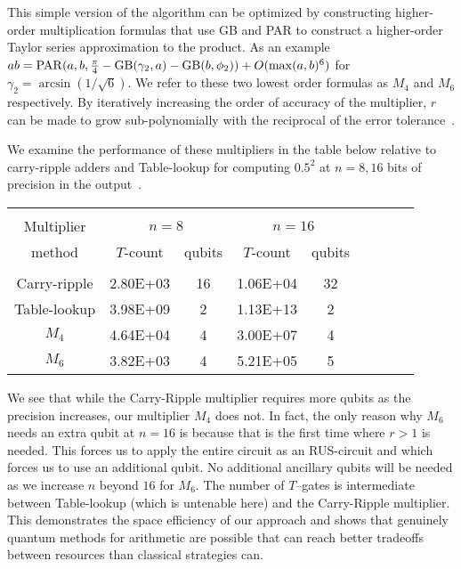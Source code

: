 \documentclass[conference]{IEEEtran}
\begin{document}
This simple version of the algorithm can be optimized by constructing higher-order multiplication formulas that use GB and PAR to construct a higher-order Taylor series approximation to the product.  As an example ${ab=\rm PAR}(a,b,\frac{\pi}{4}- {\rm GB}(\gamma_2,a)-{\rm GB}(b,\phi_2))+ O(\max(a,b)^6)$ for $\gamma_2 =\arcsin(1/\sqrt{6})$.  We refer to these two lowest order formulas as $M_4$ and $M_6$ respectively.  By iteratively increasing the order of accuracy of the multiplier, $r$ can be made to grow sub-polynomially with the reciprocal of the error tolerance~\cite{WR16}.

We examine the performance of these multipliers in the table below relative to carry-ripple adders and Table-lookup for computing $0.5^2$ at $n=8,16$ bits of precision in the output~\cite{WR16}.
\begin{table}[h!]
\centering
\footnotesize
\begin{tabular}{c@{\qquad}c@{\quad}c@{\qquad}c@{\quad}c@{\qquad}c@{\quad}c@{\qquad}c@{\quad}c}
\hline\\
Multiplier & \multicolumn{2}{c}{$n=8$\phantom{111}} & \multicolumn{2}{c}{$n=16$} \\[0.5ex]
method      & $T$-count & qubits & $T$-count & qubits \\[1.5ex]
\hline\\
Carry-ripple & 2.80E+03 & 16 & 1.06E+04  &32\\[1.5ex]
Table-lookup  & 3.98E+09 & 2 & 1.13E+13& 2\\[1.5ex]
$M_4$  &4.64E+04 &4 &3.00E+07 &4 \\[1.5ex] 
$M_6$  &3.82E+03 &4 & 5.21E+05&5 \\[1.5ex] 
\hline
\end{tabular}
\end{table}

We see that while the Carry-Ripple multiplier requires more qubits as the precision increases, our multiplier $M_4$ does not.  In fact, the only reason why $M_6$ needs an extra qubit at $n=16$ is because that is the first time where $r>1$ is needed.  This forces us to apply the entire circuit as an RUS-circuit and which forces us to use an additional qubit.  No additional ancillary qubits will be needed as we increase $n$ beyond $16$ for $M_6$.  The number of $T$--gates is intermediate between Table-lookup (which is untenable here) and the Carry-Ripple multiplier.  This demonstrates the space efficiency of our approach and shows that genuinely quantum methods for arithmetic are possible that can reach better tradeoffs between resources than classical strategies can.
\end{document}

